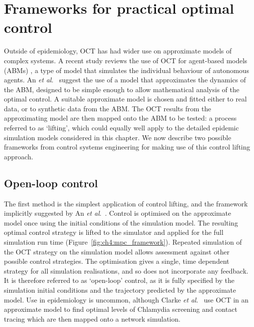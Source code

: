 \section{Frameworks for practical optimal control}
\label{sec:ch4:Frameworks}

Outside of epidemiology, OCT has had wider use on approximate models of complex systems. A recent study reviews the use of OCT for agent-based models (ABMs) \citep{an_optimization_2017}, a type of model that simulates the individual behaviour of autonomous agents. An \textit{et al}.\ \citep{an_optimization_2017} suggest the use of a model that approximates the dynamics of the ABM, designed to be simple enough to allow mathematical analysis of the optimal control. A suitable approximate model is chosen and fitted either to real data, or to synthetic data from the ABM. The OCT results from the approximating model are then mapped onto the ABM to be tested: a process referred to as `lifting', which could equally well apply to the detailed epidemic simulation models considered in this chapter. We now describe two possible frameworks from control systems engineering for making use of this control lifting approach.

\subsection*{Open-loop control}

The first method is the simplest application of control lifting, and the framework implicitly suggested by An \textit{et al}.\ \citep{an_optimization_2017}. Control is optimised on the approximate model once using the initial conditions of the simulation model. The resulting optimal control strategy is lifted to the simulator and applied for the full simulation run time (Figure~\ref{fig:ch4:mpc_framework}). Repeated simulation of the OCT strategy on the simulation model allows assessment against other possible control strategies. The optimisation gives a single, time dependent strategy for all simulation realisations, and so does not incorporate any feedback. It is therefore referred to as `open-loop' control, as it is fully specified by the simulation initial conditions and the trajectory predicted by the approximate model. Use in epidemiology is uncommon, although Clarke \textit{et al}.\ \citep{clarke_approximating_2013} use OCT in an approximate model to find optimal levels of Chlamydia screening and contact tracing which are then mapped onto a network simulation.

